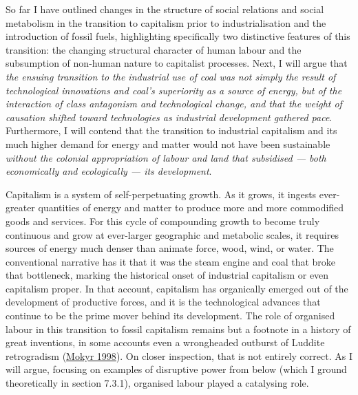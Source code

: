 \documentclass[a4paper, nobind]{templates/ociamthesis}
\begin{document}
So far I have outlined changes in the structure of social relations and social metabolism in the transition to capitalism prior to industrialisation and the introduction of fossil fuels, highlighting specifically two distinctive features of this transition: the changing structural character of human labour and the subsumption of non-human nature to capitalist processes. Next, I will argue that \emph{the ensuing transition to the industrial use of coal was not simply the result of technological innovations and coal's superiority as a source of energy, but of the interaction of class antagonism and technological change, and that the weight of causation shifted toward technologies as industrial development gathered pace}. Furthermore, I will contend that the transition to industrial capitalism and its much higher demand for energy and matter would not have been sustainable \emph{without the colonial appropriation of labour and land that subsidised --- both economically and ecologically --- its development}.

Capitalism is a system of self-perpetuating growth. As it grows, it ingests ever-greater quantities of energy and matter to produce more and more commodified goods and services. For this cycle of compounding growth to become truly continuous and grow at ever-larger geographic and metabolic scales, it requires sources of energy much denser than animate force, wood, wind, or water. The conventional narrative has it that it was the steam engine and coal that broke that bottleneck, marking the historical onset of industrial capitalism or even capitalism proper. In that account, capitalism has organically emerged out of the development of productive forces, and it is the technological advances that continue to be the prime mover behind its development. The role of organised labour in this transition to fossil capitalism remains but a footnote in a history of great inventions, in some accounts even a wrongheaded outburst of Luddite retrogradism (\protect\hyperlink{ref-mokyr_political_1998}{Mokyr 1998}). On closer inspection, that is not entirely correct. As I will argue, focusing on examples of disruptive power from below (which I ground theoretically in section 7.3.1), organised labour played a catalysing role.
\end{document}
